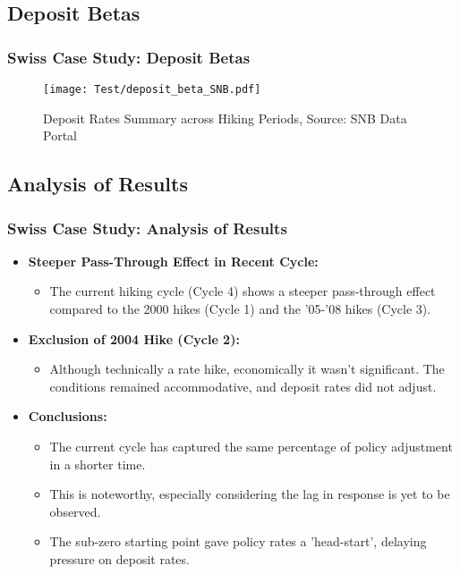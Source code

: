 \documentclass{beamer}
\begin{document}
\subsection{Deposit Betas}
\begin{frame}
\frametitle{Swiss Case Study: Deposit Betas}
\begin{center}
\begin{minipage}{1\textwidth}
\begin{figure}[H]
    \texttt{[image: Test/deposit\_beta\_SNB.pdf]}
    \caption{Deposit Rates Summary across Hiking Periods, Source: SNB Data Portal \cite{snb2023}}
    \label{fig:deposit_summary}
\end{figure}
\end{minipage}
\end{center}
\end{frame}

\subsection{Analysis of Results}
\begin{frame}
\frametitle{Swiss Case Study: Analysis of Results}
\begin{itemize}
    \item \textbf{Steeper Pass-Through Effect in Recent Cycle:}
    \begin{itemize}
        \item The current hiking cycle (Cycle 4) shows a steeper pass-through effect compared to the 2000 hikes (Cycle 1) and the '05-'08 hikes (Cycle 3).
    \end{itemize}
        \item \textbf{Exclusion of 2004 Hike (Cycle 2):}
    \begin{itemize}
        \item Although technically a rate hike, economically it wasn't significant. The conditions remained accommodative, and deposit rates did not adjust.
    \end{itemize}
        \item \textbf{Conclusions:}
    \begin{itemize}
        \item The current cycle has captured the same percentage of policy adjustment in a shorter time.
        \item This is noteworthy, especially considering the lag in response is yet to be observed.
        \item The sub-zero starting point gave policy rates a 'head-start', delaying pressure on deposit rates.
    \end{itemize}
\end{itemize}
\end{frame}
\end{document}
